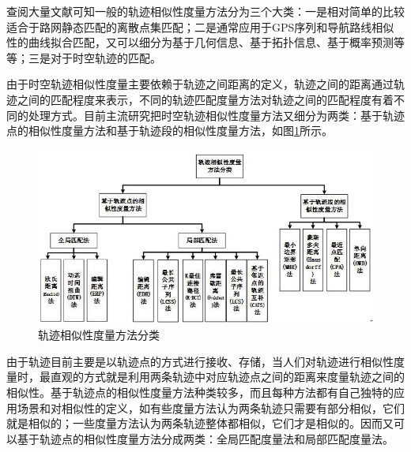 \documentclass[GBK]{ctexart}
\begin{document}
\begin{spacing}{1.5}
查阅大量文献可知一般的轨迹相似性度量方法分为三个大类：一是相对简单的比较适合于路网静态匹配的离散点集匹配；二是通常应用于GPS序列和导航路线相似性的曲线拟合匹配，又可以细分为基于几何信息、基于拓扑信息、基于概率预测等等；三是对于时空轨迹的匹配。

由于时空轨迹相似性度量主要依赖于轨迹之间距离的定义\cite{ff}，轨迹之间的距离通过轨迹之间的匹配程度来表示，不同的轨迹匹配度量方法对轨迹之间的匹配程度有着不同的处理方式。目前主流研究把时空轨迹相似性度量方法又细分为两类：基于轨迹点的相似性度量方法和基于轨迹段的相似性度量方法，如图\ref{ff}所示。
\begin{figure}[H]
  \centering
  \includegraphics[scale=0.65]{ff}
  \caption{轨迹相似性度量方法分类}\label{ff}
\end{figure}

由于轨迹目前主要是以轨迹点的方式进行接收、存储，当人们对轨迹进行相似性度量时，最直观的方式就是利用两条轨迹中对应轨迹点之间的距离来度量轨迹之间的相似性。基于轨迹点的相似性度量方法种类较多，而且每种方法都有自己独特的应用场景和对相似性的定义，如有些度量方法认为两条轨迹只需要有部分相似，它们就是相似的；一些度量方法认为两条轨迹整体都相似，它们才是相似的。因而又可以基于轨迹点的相似性度量方法分成两类：全局匹配度量法和局部匹配度量法。


\end{spacing}
\end{document}

